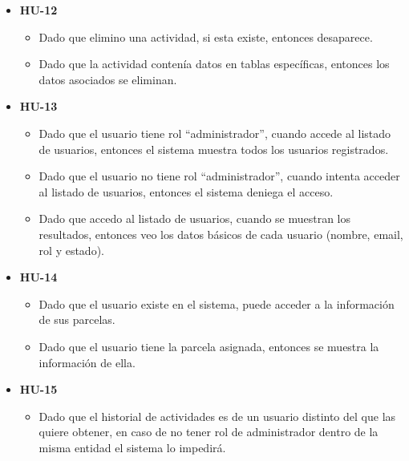 \begin{itemize}
    \item \textbf{HU-12}
    \begin{itemize}
        \item Dado que elimino una actividad, si esta existe, entonces desaparece.
        \item Dado que la actividad contenía datos en tablas específicas, entonces los datos asociados se eliminan.
    \end{itemize}
\end{itemize}

\begin{itemize}
    \item \textbf{HU-13}
    \begin{itemize}
        \item Dado que el usuario tiene rol ``administrador'', cuando accede al listado de usuarios, entonces el sistema muestra 
        todos los usuarios registrados.
        \item Dado que el usuario no tiene rol ``administrador'', cuando intenta acceder al listado de usuarios, entonces el 
        sistema deniega el acceso.
        \item Dado que accedo al listado de usuarios, cuando se muestran los resultados, entonces veo los datos básicos de 
        cada usuario (nombre, email, rol y estado).
    \end{itemize}
\end{itemize}

\begin{itemize}
    \item \textbf{HU-14}
    \begin{itemize}
        \item Dado que el usuario existe en el sistema, puede acceder a la información de sus parcelas.
        \item Dado que el usuario tiene la parcela asignada, entonces se muestra la información de ella.
    \end{itemize}
\end{itemize}

\begin{itemize}
    \item \textbf{HU-15}
    \begin{itemize}
        \item Dado que el historial de actividades es de un usuario distinto del que las quiere obtener, 
        en caso de no tener rol de administrador dentro de la misma entidad el sistema lo impedirá.
    \end{itemize}
\end{itemize}

